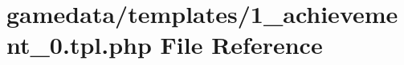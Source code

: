\hypertarget{1__achievement__0_8tpl_8php}{\section{gamedata/templates/1\+\_\+achievement\+\_\+0.tpl.\+php File Reference}
\label{1__achievement__0_8tpl_8php}
}
